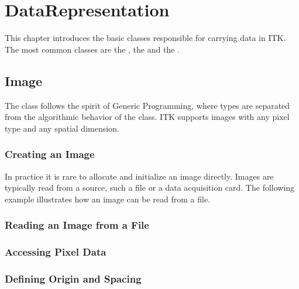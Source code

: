 
\chapter{DataRepresentation}
\label{sec:DataRepresentation}


This chapter introduces the basic classes responsible
for carrying data in ITK. The most common classes are the
, the  and the .

\section{Image}
\label{sec:ImageSection}

The  class follows the spirit of Generic Programming, where types
are separated from the algorithmic behavior of the class.  ITK supports images
with any pixel type and any spatial dimension.

\subsection{Creating an Image}\label{sec:CreatingAnImageSection}




In practice it is rare to allocate and initialize an image directly.
Images are typically read from a source, such a file or a data acquisition
card. The following example illustrates how an image can be read from
a file.




\subsection{Reading an Image from a File}
\label{sec:ReadingImageFromFile}







\subsection{Accessing Pixel Data}
\label{sec:AccessingImagePixelData}






\subsection{Defining Origin and Spacing}
\label{sec:DefiningImageOriginAndSpacing}

